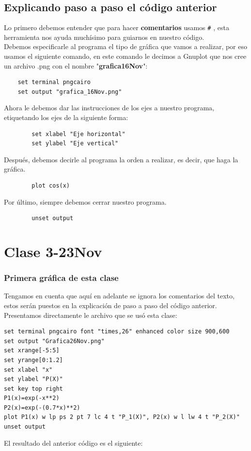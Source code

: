 \documentclass[onecolumn]{article} %
\begin{document}
\subsection{Explicando paso a paso el código anterior}
Lo primero debemos entender que para hacer \textbf{comentarios} usamos \verb+#+ , esta herramienta nos ayuda muchísimo para guiarnos en nuestro código.\\
Debemos especificarle al programa el tipo de gráfica que vamos a realizar, por eso usamos el siguiente comando, en este comando le decimos a Gnuplot que nos cree un archivo .png con el nombre "\textbf{grafica16Nov}":
	\begin{verbatim}
	set terminal pngcairo
	set output "grafica_16Nov.png"
	\end{verbatim}
Ahora le debemos dar las instrucciones de los ejes a nuestro programa, etiquetando los ejes de la siguiente forma:
	\begin{verbatim}
		set xlabel "Eje horizontal"
		set ylabel "Eje vertical"
	\end{verbatim}
Después, debemos decirle al programa la orden a realizar, es decir, que haga la gráfica.
	\begin{verbatim}
		plot cos(x)
	\end{verbatim}
Por último, siempre debemos cerrar nuestro programa.
	\begin{verbatim}
		unset output
	\end{verbatim}
\section{Clase 3-23Nov}
\subsubsection{Primera gráfica de esta clase}
Tengamos en cuenta que aquí en adelante se ignora los comentarios del texto, estos serán puestos en la explicación de paso a paso del código anterior. Presentamos directamente le archivo que se usó esta clase:
	\begin{verbatim}
set terminal pngcairo font "times,26" enhanced color size 900,600
set output "Grafica26Nov.png"
set xrange[-5:5]
set yrange[0:1.2]
set xlabel "x"
set ylabel "P(X)"
set key top right
P1(x)=exp(-x**2)
P2(x)=exp(-(0.7*x)**2)
plot P1(x) w lp ps 2 pt 7 lc 4 t "P_1(X)", P2(x) w l lw 4 t "P_2(X)"
unset output

	\end{verbatim}
El resultado del anterior código es el siguiente:
\end{document}
